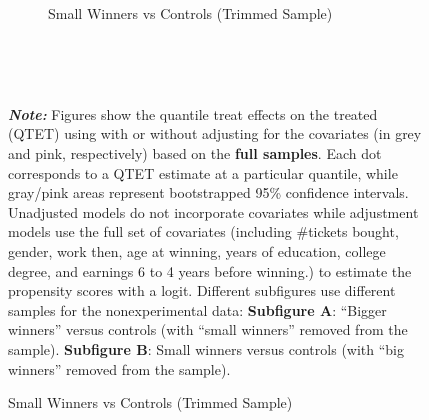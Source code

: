 \documentclass[letterpaper,12pt,leqno]{article}
\begin{document}
\begin{figure}[!ht]
\begin{minipage}[c]{1\textwidth}
\begin{subfigure}{1\linewidth}
            \caption{Small Winners vs Controls (Trimmed Sample)}
        \end{subfigure}\\        
    \end{minipage}%
    \\\raggedright
     {\footnotesize\textbf{\textit{Note:}} Figures show the quantile treat effects on the treated (QTET) using with or without adjusting for the covariates (in grey and pink, respectively) based on the \textbf{full samples}. Each dot corresponds to a QTET estimate at a particular quantile, while gray/pink areas represent bootstrapped 95\% confidence intervals. Unadjusted models do not incorporate covariates while adjustment models use the full set of covariates (including \#tickets bought, gender, work then, age at winning, years of education, college degree, and earnings 6 to 4 years before winning.) to estimate the propensity scores with a logit. Different subfigures use different samples for the nonexperimental data: \textbf{Subfigure A}: ``Bigger winners'' versus controls (with ``small winners'' removed from the sample). \textbf{Subfigure B}: Small winners versus controls (with ``big winners'' removed from the sample).}
\end{figure}
\clearpage
\end{document}
